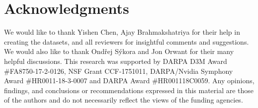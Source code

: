\section*{Acknowledgments}

We would like to thank Yishen Chen, Ajay Brahmakshatriya for their help in creating the datasets, and all reviewers for insightful comments and suggestions.
We would also like to thank Ond\v{r}ej S\'{y}kora and Jon Orwant for their many helpful discussions.
This research was supported by DARPA D3M Award \#FA8750-17-2-0126, NSF Grant CCF-1751011, DARPA/Nvidia Symphony Award \#HR0011-18-3-0007 and DARPA Award \#HR001118C0059.
Any opinions, findings, and conclusions or recommendations expressed in this material are those of the authors and do not necessarily reflect the views of the funding agencies.
